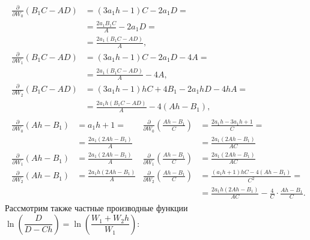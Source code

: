 \documentclass[a4paper,14pt]{article}
\begin{document}
\begin{equation*}
  \begin{gathered}
    \begin{aligned}
      \frac{\partial }{\partial W_0} \left(
      B_1 C - A D
      \right)
      &=
        (3 a_1 h - 1) C - 2 a_1 D
        = \\
      &=
        \frac{2 a_1 B_1 C}{A}
        - 2 a_1 D
        = \\
      &=
        \frac{2 a_1 (B_1 C - A D)}{A}, \\
      \frac{\partial }{\partial W_1} \left(
      B_1 C - A D
      \right)
      &=
        (3 a_1 h - 1) C - 2 a_1 D - 4 A
        = \\
      &=
        \frac{2 a_1 (B_1 C - A D)}{A} - 4 A, \\
      \frac{\partial }{\partial W_2} \left(
      B_1 C - A D
      \right)
      &=
        (3 a_1 h - 1) h C + 4 B_1 - 2 a_1 h D - 4 h A
        = \\
      &=
        \frac{2 a_1 h (B_1 C - A D)}{A} - 4 (A h - B_1),
    \end{aligned}
    \\
    \begin{aligned}
      \frac{\partial }{\partial W_0} \left(
      A h - B_1
      \right)
      &=
        a_1 h + 1 =
      &
      \frac{\partial }{\partial W_0} \left(
      \frac{A h - B_1}{C}
      \right)
      &=
        \frac{2 a_1 h - 3 a_1 h + 1}{C} = \\
      &= \frac{2 a_1 (2 A h - B_1)}{A}
      &
      &= \frac{2 a_1 (2 A h - B_1)}{A C}
        \\
      \frac{\partial }{\partial W_1} \left(
      A h - B_1
      \right)
      &= \frac{2 a_1 (2 A h - B_1)}{A}
      &
      \frac{\partial }{\partial W_1} \left(
      \frac{A h - B_1}{C}
      \right)
      &= \frac{2 a_1 (2 A h - B_1)}{A C}
        \\
      \frac{\partial }{\partial W_2} \left(
      A h - B_1
      \right)
      &= \frac{2 a_1 h (2 A h - B_1)}{A}
      &
      \frac{\partial }{\partial W_2} \left(
      \frac{A h - B_1}{C}
      \right)
      &=
        \frac{(a_1 h + 1) h C - 4 (A h - B_1)}{C^2} = \\
      &&
      &= \frac{2 a_1 h (2 A h - B_1)}{A C} - \frac{4}{C} \cdot \frac{A h - B_1}{C}.
    \end{aligned}
  \end{gathered}
\end{equation*}
Рассмотрим также частные производные функции
$\ln \left(\dfrac{D}{D - Ch}\right) = \ln \left(\dfrac{W_1 + W_2 h}{W_1}\right)$:
\end{document}
